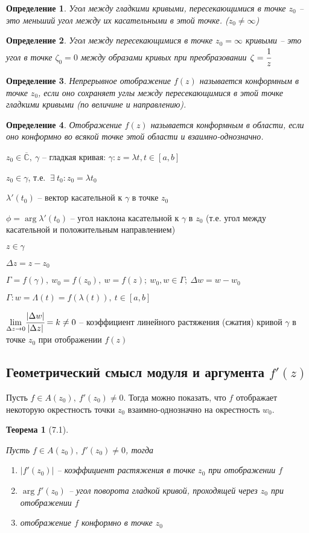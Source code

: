 \documentclass[draft]{report}
\newcommand{\forcenewline}{$\phantom{\mbox{newline}}$\newline}
\renewcommand{\C}{\mathbb{C}}
\newcommand{\mlim}[1]{\underset{#1}{\lim}}
\renewcommand{\bar}{\overline}
\newcommand{\g}{\gamma}
\renewcommand{\f}{\phi}
\renewcommand{\l}{\lambda}
\newcommand{\D}{\Delta}
\newcommand{\E}{\ \exists}
\newcommand{\CC}{\bar{\C}}
\newcommand{\opr}[1]{\begin{opred}#1\end{opred}}
\newtheorem*{theor}{Теорема}
\newtheorem*{opred}{Определение}
\theoremstyle{remark}
\begin{document}
\opr{Угол между гладкими кривыми, пересекающимися в точке $z_0$ -- это меньший угол между их касательными в этой точке. ($z_0\neq\infty$)}

\opr{Угол между пересекающимися в точке $z_0=\infty$ кривыми -- это угол в точке $\zeta_0=0$ между образами кривых при преобразовании $\zeta=\cfrac1z$}

\opr{Непрерывное отображение $f(z)$ называется конформным в точке $z_0$, если оно сохраняет углы между пересекающимися в этой точке гладкими кривыми (по величине и направлению).}

\opr{Отображение $f(z)$ называется конформным в области, если оно конформно во всякой точке этой области и взаимно-однозначно.}

$z_0\in\CC,\ \gamma$ -- гладкая кривая: $\gamma\colon z=\lambda{t},t\in[a,b]$

$z_0\in\gamma$, т.е. $\E\ t_0\colon z_0=\lambda{t_0}$

$\lambda'(t_0)$ -- вектор касательной к $\gamma$ в точке $z_0$

$\f=\arg \l'(t_0)$ -- угол наклона касательной к $\g$ в $z_0$ (т.е. угол между касательной и положительным направлением)

$z\in\g$

$\D z=z-z_0$

$\Gamma=f(\gamma),\ w_0=f(z_0),\ w=f(z);\ w_0,w\in\Gamma;\ \D w=w-w_0$

$\Gamma\colon w=\Lambda(t)=f(\l(t)),\ t\in[a,b]$

$\mlim{\D z\to0}\cfrac{|\D w|}{|\D z|}=k\neq0$ -- коэффициент линейного растяжения (сжатия) кривой $\g$ в точке $z_0$ при отображении $f(z)$

\subsection{Геометрический смысл модуля и аргумента $f'(z)$}

Пусть $f\in A(z_0),\ f'(z_0)\neq0$. Тогда можно показать, что $f$ отображает некоторую окрестность точки $z_0$ взаимно-однозначно на окрестность $w_0$.

\begin{theor}[7.1]
\forcenewline

Пусть $f\in A(z_0),\ f'(z_0)\neq0$, тогда
\begin{enumerate}
\item[а)] $|f'(z_0)|$ -- коэффициент растяжения в точке $z_0$ при отображении $f$
\item[б)] $\arg f'(z_0)$ -- угол поворота гладкой кривой, проходящей через $z_0$ при отображении $f$
\item[в)] отображение $f$ конформно в точке $z_0$
\end{enumerate}
\end{theor}
\end{document}
